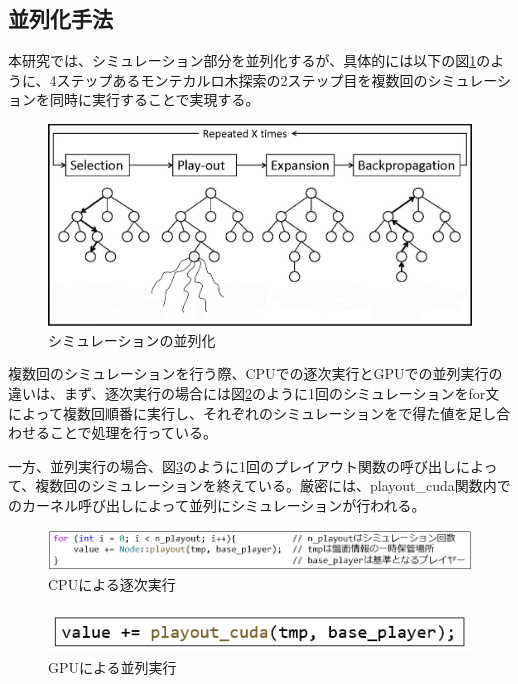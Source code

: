 \documentclass[10pt, a4paper]{jsarticle}
\begin{document}
\subsection{並列化手法}
本研究では、シミュレーション部分を並列化するが、具体的には以下の図\ref{fig:parallel}のように、4ステップあるモンテカルロ木探索の2ステップ目を複数回のシミュレーションを同時に実行することで実現する。
\begin{figure}[ht]
    \begin{center}
        \includegraphics[width=15cm]{img/mcts_parallel.jpg}
        \caption{シミュレーションの並列化} \label{fig:parallel}
    \end{center}
\end{figure}
\par 複数回のシミュレーションを行う際、CPUでの逐次実行とGPUでの並列実行の違いは、まず、逐次実行の場合には図\ref{fig:cpu_mcts_code}のように1回のシミュレーションをfor文によって複数回順番に実行し、それぞれのシミュレーションをで得た値を足し合わせることで処理を行っている。
\par 一方、並列実行の場合、図\ref{fig:gpu_mcts_code}のように1回のプレイアウト関数の呼び出しによって、複数回のシミュレーションを終えている。厳密には、playout\_cuda関数内でのカーネル呼び出しによって並列にシミュレーションが行われる。
\begin{figure}[ht]
    \begin{center}
        \includegraphics[width=15cm]{img/cpu_mcts_code.png}
        \caption{CPUによる逐次実行}
        \label{fig:cpu_mcts_code}
    \end{center}
\end{figure}
\begin{figure}[ht]
    \begin{center}
        \includegraphics[width=12cm]{img/gpu_mcts_code.png}
        \caption{GPUによる並列実行}
        \label{fig:gpu_mcts_code}
    \end{center}
\end{figure}
\end{document}
